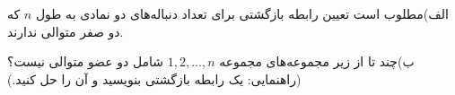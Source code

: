 \EXERCISE
الف)مطلوب است تعیین رابطه بازگشتی برای تعداد دنباله‌های دو نمادی به طول
$n$
که دو صفر متوالی ندارند.

ب)چند تا از زیر مجموعه‌های مجموعه
${1, 2, ..., n}$
شامل دو عضو متوالی نیست؟
(راهنمایی: یک رابطه بازگشتی بنویسید و آن را حل کنید.)